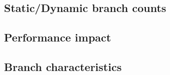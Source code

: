 %
%

\subsection{Static/Dynamic branch counts}

\subsection{Performance impact}

\subsection{Branch characteristics}

